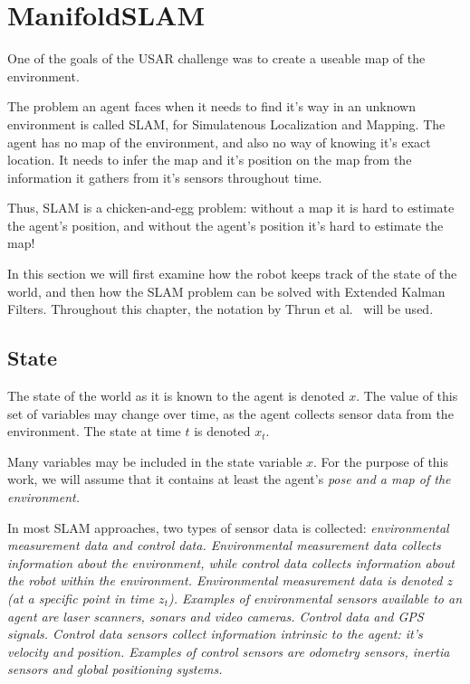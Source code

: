 \chapter{ManifoldSLAM}
\label{slam}
One of the goals of the USAR challenge was to create a useable map of the environment. 

The problem an agent faces when it needs to find it's way in an unknown environment is called SLAM, for Simulatenous Localization and Mapping. The agent has no map of the environment, and also no way of knowing it's exact location. It needs to infer the map and it's position on the map from the information it gathers from it's sensors throughout time.

Thus, SLAM is a chicken-and-egg problem: without a map it is hard to estimate the agent's position, and without the agent's position it's hard to estimate the map!

In this section we will first examine how the robot keeps track of the state of the world, and then how the SLAM problem can be solved with Extended Kalman Filters. Throughout this chapter, the notation by Thrun et al.\ \cite{thrun2002probabilistic} will be used.

\section{State}
\label{slam:state}
The state of the world as it is known to the agent is denoted $x$. The value of this set of variables may change over time, as the agent collects sensor data from the environment. The state at time $t$ is denoted $x_{t}$. 

Many variables may be included in the state variable $x$. For the purpose of this work, we will assume that it contains at least the agent's \em{pose} and a \em{map of the environment}. 

In most SLAM approaches, two types of sensor data is collected: \em{environmental measurement data} and \em{control data}. Environmental measurement data collects information about the environment, while control data collects information about the robot within the environment. Environmental measurement data  is denoted $z$ (at a specific point in time $z_{t}$). Examples of environmental sensors available to an agent are laser scanners, sonars and video cameras. Control data and GPS signals. Control data sensors collect information intrinsic to the agent: it's velocity and position. Examples of control sensors are odometry sensors, inertia sensors and global positioning systems.

